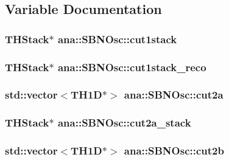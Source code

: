 \subsection{Variable Documentation}
\hypertarget{namespaceana_1_1SBNOsc_af8390393ea68437d73758036b740a73f}{
\subsubsection[{cut1stack}]{\setlength{\rightskip}{0pt plus 5cm}THStack$\ast$ {\bf ana::SBNOsc::cut1stack}}}
\label{namespaceana_1_1SBNOsc_af8390393ea68437d73758036b740a73f}
\hypertarget{namespaceana_1_1SBNOsc_a5b54ee23ff0072697a843d8a459efdfc}{
\subsubsection[{cut1stack\_\-reco}]{\setlength{\rightskip}{0pt plus 5cm}THStack$\ast$ {\bf ana::SBNOsc::cut1stack\_\-reco}}}
\label{namespaceana_1_1SBNOsc_a5b54ee23ff0072697a843d8a459efdfc}
\hypertarget{namespaceana_1_1SBNOsc_a9b9151469b378e181b41a28c26adc0e5}{
\subsubsection[{cut2a}]{\setlength{\rightskip}{0pt plus 5cm}std::vector$<$TH1D$\ast$$>$ {\bf ana::SBNOsc::cut2a}}}
\label{namespaceana_1_1SBNOsc_a9b9151469b378e181b41a28c26adc0e5}
\hypertarget{namespaceana_1_1SBNOsc_a0c223e1ce88af244e57230b4772e1c43}{
\subsubsection[{cut2a\_\-stack}]{\setlength{\rightskip}{0pt plus 5cm}THStack$\ast$ {\bf ana::SBNOsc::cut2a\_\-stack}}}
\label{namespaceana_1_1SBNOsc_a0c223e1ce88af244e57230b4772e1c43}
\hypertarget{namespaceana_1_1SBNOsc_a13e04f5a0bc2bf349e9947a45bc609bb}{
\subsubsection[{cut2b}]{\setlength{\rightskip}{0pt plus 5cm}std::vector$<$TH1D$\ast$$>$ {\bf ana::SBNOsc::cut2b}}}
